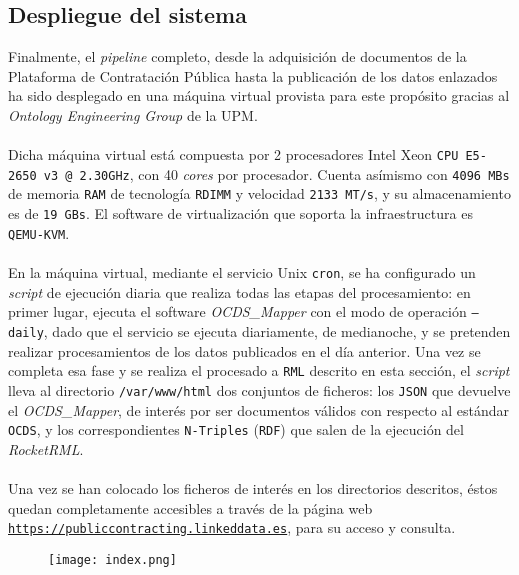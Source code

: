     \subsection{Despliegue del sistema}
        Finalmente, el \textit{pipeline} completo, desde la adquisición de documentos de la Plataforma de Contratación Pública hasta la publicación de los datos enlazados ha sido desplegado en una máquina virtual provista para este propósito gracias al \textit{Ontology Engineering Group} \cite{OEG} de la UPM.
        \\ \\
        Dicha máquina virtual está compuesta por 2 procesadores Intel Xeon \texttt{CPU E5-2650 v3 @ 2.30GHz}, con 40 \textit{cores} por procesador. Cuenta asímismo con \texttt{4096 MBs} de memoria \texttt{RAM} de tecnología \texttt{RDIMM} y velocidad \texttt{2133 MT/s}, y su almacenamiento es de \texttt{19 GBs}. El software de virtualización que soporta la infraestructura es \texttt{QEMU-KVM}.
        \\ \\
        En la máquina virtual, mediante el servicio Unix \texttt{cron}, se ha configurado un \textit{script} de ejecución diaria que realiza todas las etapas del procesamiento: en primer lugar, ejecuta el software \textit{OCDS\_Mapper} con el modo de operación \texttt{--daily}, dado que el servicio se ejecuta diariamente, de medianoche, y se pretenden realizar procesamientos de los datos publicados en el día anterior. Una vez se completa esa fase y se realiza el procesado a \texttt{RML} descrito en esta sección, el \textit{script} lleva al directorio \texttt{/var/www/html} dos conjuntos de ficheros: los \texttt{JSON} que devuelve el \textit{OCDS\_Mapper}, de interés por ser documentos válidos con respecto al estándar \texttt{OCDS}, y los correspondientes \texttt{N-Triples} (\texttt{RDF}) que salen de la ejecución del \textit{RocketRML}.
        \\ \\
        Una vez se han colocado los ficheros de interés en los directorios descritos, éstos quedan completamente accesibles a través de la página web \texttt{\url{https://publiccontracting.linkeddata.es}}, para su acceso y consulta.
        
        \begin{figure}[h]
            \centering
            \texttt{[image: index.png]}
        \end{figure}
        
